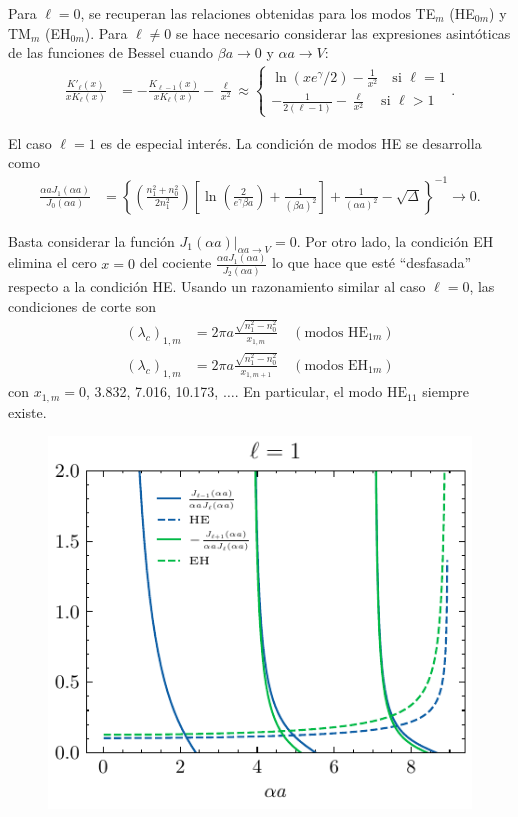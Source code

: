 Para $\ell = 0$, se recuperan las relaciones obtenidas para los modos  TE$_m$ (HE$_{0m}$) y TM$_m$ (EH$_{0m}$). Para $\ell \neq 0$ se hace necesario considerar las expresiones asintóticas de las funciones de Bessel cuando $\beta a \to 0$ y $\alpha a \to V$:
\begin{align*}
	\frac{K'_\ell (x)}{xK_\ell (x)} &= -\frac{K_{\ell-1} (x)}{xK_\ell (x)}-\frac{\ell}{x^2}\approx \left\{\begin{matrix}
	\ln(xe^\gamma/2)-\frac{1}{x^2} \quad\text{si }\ell = 1
	\\
	-\frac{
	1}{2(\ell-1)}-\frac{\ell}{x^2}\quad \text{si }\ell > 1
	\end{matrix}\right. .
\end{align*}


El caso $\ell=1$ es de especial interés. La condición de modos HE se desarrolla como
\begin{align*}
	\frac{\alpha a J_1(\alpha a)}{J_0(\alpha a)} &= \left\{\left(\frac{n_1^2+n_0^2}{2n_1^2}\right) \left[ \ln\left(\frac{2}{e^\gamma \beta a}\right)+\frac{1}{(\beta a)^2} \right]+\frac{1}{(\alpha a)^2}-\sqrt{\Delta}\right\}^{-1} \to 0.
\end{align*}

Basta considerar la función $J_1(\alpha a)|_{\alpha a \to V} = 0$. Por otro lado, la condición EH elimina el cero $x=0$ del cociente $\frac{\alpha aJ_1(\alpha a)}{J_2(\alpha a)}$ lo que hace que esté ``desfasada'' respecto a la condición HE. Usando un razonamiento similar al caso $\ell =0$, las condiciones de corte son
\begin{align*}
	(\lambda_c)_{1,m} &= 2\pi a \frac{\sqrt{n_1^2 - n_0^2}}{x_{1,m}} \quad \left(\text{modos HE}_{1m}\right)
	\\
	(\lambda_c)_{1,m} &= 2\pi a \frac{\sqrt{n_1^2 - n_0^2}}{x_{1,m+1}} \quad \left(\text{modos EH}_{1m}\right)
\end{align*}
con $x_{1,m}=0$, 3.832,  7.016, 10.173, $\dots$.
En particular, el modo $\text{HE}_{11}$ siempre existe.
\begin{figure}[H]
	\centering	\includegraphics[width=0.6\linewidth]{media/fibergraphicalHE_EH.pdf}
\end{figure}

